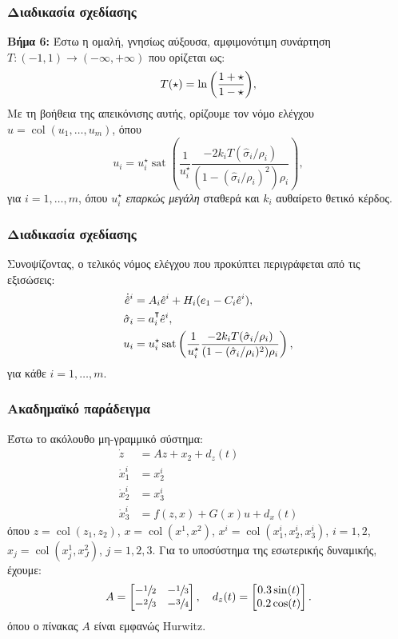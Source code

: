 \documentclass{beamer}
\DeclareMathOperator{\sat}{sat}
\DeclareMathOperator{\col}{col}
\newcommand\T{{\mathpalette\raiseT\intercal}}
\newcommand\raiseT[2]{\raisebox{0.45ex}{$#1#2$}}
\begin{document}
    \begin{frame}
        \frametitle{Διαδικασία σχεδίασης}
        \textbf{Βήμα 6:} Έστω η ομαλή, γνησίως αύξουσα, αμφιμονότιμη συνάρτηση $T: (-1, 1) \rightarrow (-\infty, +\infty)$ που ορίζεται ως:
        \[
            T(\star) = \ln \pqty{\frac{1+\star}{1-\star}},
        \]
        Με τη βοήθεια της απεικόνισης αυτής, ορίζουμε τον νόμο ελέγχου $u = \col(u_1, \ldots, u_m)$, όπου
        \begin{equation*}
            u_i = u_i^\star \sat\left(\frac{1}{u_i^\star} 
            \frac{ -2 k_i T(\hat \sigma_i/ \rho_i)}
            {(1 - (\hat \sigma_i/ \rho_i)^2)\rho_i} \right),
        \end{equation*}
        για $i = 1, \ldots, m$, όπου $u_i^\star$ \emph{επαρκώς μεγάλη} σταθερά και $k_i$ αυθαίρετο θετικό κέρδος.
    \end{frame}
  
    \begin{frame}
        \frametitle{Διαδικασία σχεδίασης}
        Συνοψίζοντας, ο τελικός νόμος ελέγχου που προκύπτει περιγράφεται από τις εξισώσεις:
        \begin{align*}
            \dot{\hat e}^i &= A_i \hat e^i + H_i (e_1 - C_i \hat e^i),\\
            \hat \sigma_i &= a_i^\T \hat e^i,\\
            u_i &= u_i^\star \sat\left(\frac{1}{u_i^\star} 
                \frac{ -2 k_i T(\hat \sigma_i/ \rho_i)}
                {(1 - (\hat \sigma_i/ \rho_i)^2)\rho_i} \right),
        \end{align*}
        για κάθε $i = 1,\ldots, m$.
    \end{frame}
    
    \begin{frame}
      \frametitle{Ακαδημαϊκό παράδειγμα}
      Έστω το ακόλουθο μη-γραμμικό σύστημα:
      \begin{align*}
          \dot z &= A z + x_2 + d_z(t)\\
          \dot x_1^i &= x_2^i \\
          \dot x_2^i &= x_3^i \\
          \dot x_3^i &= f(z, x) + G(x)u + d_x(t)
      \end{align*}
      όπου $z = \col(z_1, z_2)$, $x = \col(x^1, x^2)$, $x^i = \col(x_1^i, x_2^i, x_3^i)$, $i =1, 2$, $x_j = \col(x_j^1, x_J^2)$, $j = 1,2,3$. Για το υποσύστημα της εσωτερικής δυναμικής, έχουμε:
      \[
      A = \bmqty{-\sfrac{1}{2} & -\sfrac{1}{3}\\ -\sfrac{2}{3} & -\sfrac{3}{4}},\quad d_z(t) = \bmqty{0.3 \sin(t)\\ 0.2\cos(t)}.
      \]
      όπου ο πίνακας $A$ είναι εμφανώς \textlatin{Hurwitz}.
    \end{frame}
    
\end{document}
